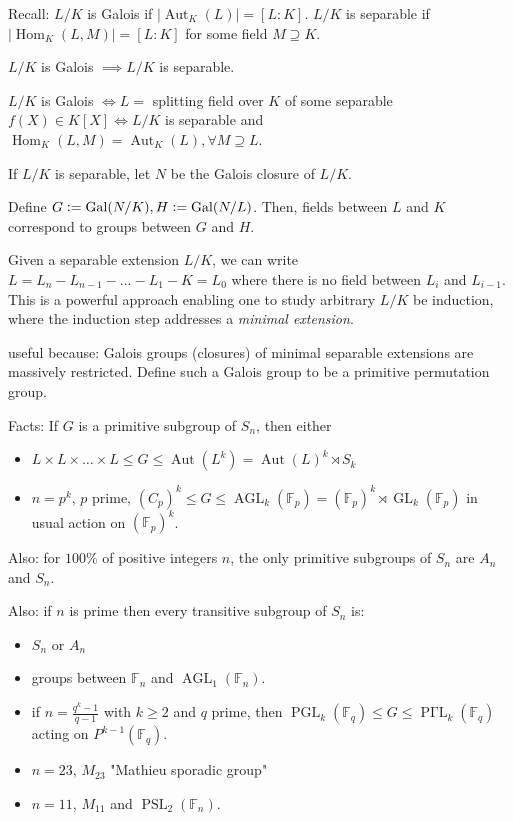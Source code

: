 \documentclass{article}
\newcommand{\F}{\mathbb{F}}
\def \Hom {\operatorname{Hom}}
\def \GL {\operatorname{GL}}
\def \Aut {\operatorname{Aut}}
\def \Gal {\operatorname{Gal}}
\newcommand{\defeq}{\vcentcolon=}
\theoremstyle{definition}
\theoremstyle{remark}
\begin{document}

Recall: $L/K$ is Galois if $|\Aut_K(L)| = [L : K]$. $L/K$ is separable if $|\Hom_K(L, M)| = [L: K]$ for some field $M \supseteq K$.

$L/K$ is Galois $\implies L/K$ is separable.

$L/K$ is Galois $\iff L = $ splitting field over $K$ of some separable $f(X) \in K[X] \iff L/K$ is separable and $\Hom_K(L, M) = \Aut_K(L), \forall M \supseteq L$.

If $L/K$ is separable, let $N$ be the Galois closure of $L/K$.

Define $G \defeq \Gal(N/K), H \defeq \Gal(N/L)$. Then, fields between $L$ and $K$ correspond to groups between $G$ and $H$.

Given a separable extension $L/K$, we can write $L = L_n - L_{n-1} - \ldots - L_1 - K = L_0$ where there is no field between $L_i$ and $L_{i - 1}$. This is a powerful approach enabling one to study arbitrary $L/K$ be induction, where the induction step addresses a \emph{minimal extension}.

useful because: Galois groups (closures) of minimal separable extensions are massively restricted. Define such a Galois group to be a primitive permutation group.

Facts: If $G$ is a primitive subgroup of $S_n$, then either \begin{itemize}
  \item $L \times L \times \ldots \times L \leq G \leq \Aut(L^k) = \Aut(L)^k \rtimes S_k$
  \item $n = p^k$, $p$ prime, $(C_p)^k \leq G \leq \operatorname{AGL}_k(\F_p) = (\F_p)^k \rtimes \GL_k(\F_p)$ in usual action on $(\F_p)^k$.
\end{itemize} 

Also: for $100\%$ of positive integers $n$, the only primitive subgroups of $S_n$ are $A_n$ and $S_n$.

Also: if $n$ is prime then every transitive subgroup of $S_n$ is: \begin{itemize}
  \item $S_n$ or $A_n$
  \item groups between $\F_n$ and $\operatorname{AGL}_1(\F_n)$.
  \item if $n = \frac{q^k-1}{q-1}$ with $k \geq 2$ and $q$ prime, then $\operatorname{PGL}_k(\F_q) \leq G \leq \operatorname{P \Gamma L}_k(\F_q)$ acting on $P^{k-1}(\F_q)$.
  \item $n = 23$, $M_{23}$ "Mathieu sporadic group"
  \item $n = 11$, $M_{11}$ and $\operatorname{PSL}_2(\F_n)$.
\end{itemize}
\end{document}
